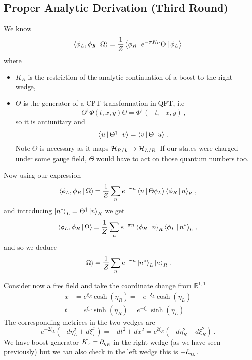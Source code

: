 \documentclass{article}
\begin{document}
\subsection{Proper Analytic Derivation (Third Round)}
We know 
\[
\left\langle \phi_L, \phi_R \, | \, \Omega \right\rangle = \frac{1}{Z} \left\langle \phi_R \, | \, e^{-\pi K_R} \Theta \, | \, \phi_L \right\rangle
\]
where 
\begin{itemize}
	\item $K_R$ is the restriction of the analytic continuation of a boost to the right wedge, 
	\item $\Theta$ is the generator of a CPT transformation in QFT, i.e 
	\[
	\Theta^\dagger \Phi(t,x, y) \Theta = \Phi^\dagger(-t, -x, y) \, ,
	\]
	so it is antiunitary and 
	\[
	\left\langle u \, | \, \Theta^\dagger \, | \, v \right\rangle = \left\langle v \, | \, \Theta \, | \, u \right\rangle \, .
	\]
	Note $\Theta$ is necessary as it maps $\mathcal{H}_{R/L} \to \mathcal{H}_{L/R}$. If our states were charged under some gauge field, $\Theta$ would have to act on those quantum numbers too. 
\end{itemize}
Now using our expression 
\[
\left\langle \phi_L, \phi_R \, | \, \Omega \right\rangle = \frac{1}{Z} \sum_n e^{- \pi n} \left\langle n \, | \, \Theta \phi_L \right\rangle \left\langle  \phi_R \, | \, n \right\rangle_R \, , 
\]
and introducing $\ket{n^\ast}_L = \Theta^\dagger \ket{n}_R$ we get 
\[
\left\langle \phi_L, \phi_R \, | \, \Omega \right\rangle = \frac{1}{Z} \sum_n e^{- \pi n} \left\langle \phi_R \, \ \, n \right\rangle_R \left\langle \phi_L \, | \, n^\ast \right\rangle_L \, , 
\]
and so we deduce
\[
\ket{\Omega} = \frac{1}{Z} \sum_n e^{- \pi n} \ket{n^\ast}_L \ket{n}_R \, . 
\]
\begin{remark}
	Consider now a free field and take the coordinate change from $\mathbb{R}^{1,1}$ 
	\begin{align*}
		x &= e^{\xi_R} \cosh(\eta_R)  = -e^{-\xi_L} \cosh(\eta_L)\\ 
		t &= e^{\xi_R} \sinh(\eta_R)  = e^{-\xi_L} \sinh(\eta_L)
	\end{align*}
The corresponding metrices in the two wedges are 
\[
e^{-2\xi_L}(-d\eta_L^2 + d\xi_L^2) = -dt^2 +dx^2 = e^{2\xi_R}(-d\eta_R^2 + d\xi_R^2) \, .
\]
We have boost generator $K_x = \partial_{\eta_R}$ in the right wedge (as we have seen previously) but we can also check in the left wedge this is $-\partial_{\eta_L}$. 
\end{remark}
\end{document}
